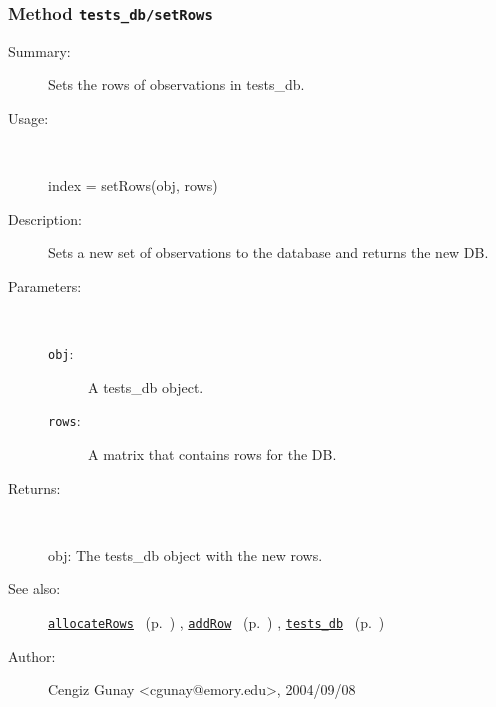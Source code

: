 \subsubsection[Method \texttt{setRows}]{Method \texttt{tests\_db/setRows}}%
%
\label{ref_tests_db__setRows}%
\hypertarget{ref_tests_db__setRows}{}%
\begin{description}
\item[Summary:]Sets the rows of observations in tests\_db.
%
\item[Usage:]~%
\begin{lyxcode}%
index = setRows(obj, rows)
%
\end{lyxcode}%
%
\item[Description:]%
Sets a new set of observations to the database and returns the new DB.
\item[Parameters:]~
\begin{description}%
\item[\texttt{obj}:]
 A tests\_db object.
\item[\texttt{rows}:]
 A matrix that contains rows for the DB.
\end{description}%
%
\item[Returns:
]~

	obj: The tests\_db object with the new rows.
%
%
\item[See also:]%
\hyperlink{ref_allocateRows}{\texttt{allocateRows}}%
\ (p.~\pageref{ref_allocateRows})%
%
, \hyperlink{ref_addRow}{\texttt{addRow}}%
\ (p.~\pageref{ref_addRow})%
%
, \hyperlink{ref_tests_db}{\texttt{tests\_db}}%
\ (p.~\pageref{ref_tests_db})%
%
%
\item[Author:]%
Cengiz Gunay <cgunay@emory.edu>, 2004/09/08
%
\end{description}
\methodline%
